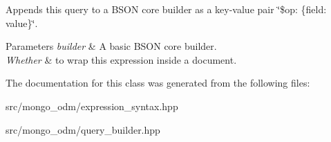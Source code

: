 Appends this query to a B\+S\+ON core builder as a key-\/value pair \char`\"{}\$op\+: \{field\+: value\}\char`\"{}. 


\begin{DoxyParams}{Parameters}
{\em builder} & A basic B\+S\+ON core builder. \\
\hline
{\em Whether} & to wrap this expression inside a document. \\
\hline
\end{DoxyParams}


The documentation for this class was generated from the following files\+:\begin{DoxyCompactItemize}
\item 
src/mongo\+\_\+odm/expression\+\_\+syntax.\+hpp\item 
src/mongo\+\_\+odm/query\+\_\+builder.\+hpp\end{DoxyCompactItemize}
